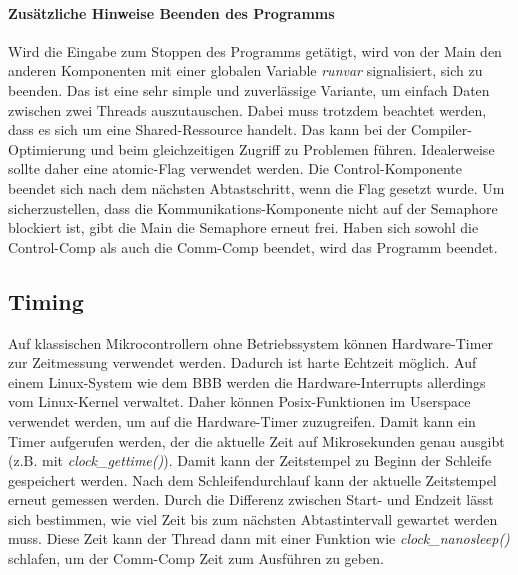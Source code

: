             \paragraph{Zusätzliche Hinweise Beenden des Programms}
                Wird die Eingabe zum Stoppen des Programms getätigt, wird von der Main den anderen Komponenten mit einer globalen Variable \textit{runvar} signalisiert, sich zu beenden. Das ist eine sehr simple und zuverlässige Variante, um einfach Daten zwischen zwei Threads auszutauschen. Dabei muss trotzdem beachtet werden, dass es sich um eine Shared-Ressource handelt. Das kann bei der Compiler-Optimierung und beim gleichzeitigen Zugriff zu Problemen führen. Idealerweise sollte daher eine atomic-Flag verwendet werden. Die Control-Komponente beendet sich nach dem nächsten Abtastschritt, wenn die Flag gesetzt wurde. Um sicherzustellen, dass die Kommunikations-Komponente nicht auf der Semaphore blockiert ist, gibt die Main die Semaphore erneut frei. Haben sich sowohl die Control-Comp als auch die Comm-Comp beendet, wird das Programm beendet.

        \subsection{Timing}
            Auf klassischen Mikrocontrollern ohne Betriebssystem können Hardware-Timer zur Zeitmessung verwendet werden. Dadurch ist harte Echtzeit möglich. Auf einem Linux-System wie dem BBB werden die Hardware-Interrupts allerdings vom Linux-Kernel verwaltet. Daher können Posix-Funktionen im Userspace verwendet werden, um auf die Hardware-Timer zuzugreifen. Damit kann ein Timer aufgerufen werden, der die aktuelle Zeit auf Mikrosekunden genau ausgibt (z.B. mit \textit{clock\_gettime()}). Damit kann der Zeitstempel zu Beginn der Schleife gespeichert werden. Nach dem Schleifendurchlauf kann der aktuelle Zeitstempel erneut gemessen werden. Durch die Differenz zwischen Start- und Endzeit lässt sich bestimmen, wie viel Zeit bis zum nächsten Abtastintervall gewartet werden muss. Diese Zeit kann der Thread dann mit einer Funktion wie \textit{clock\_nanosleep()} schlafen, um der Comm-Comp Zeit zum Ausführen zu geben.

